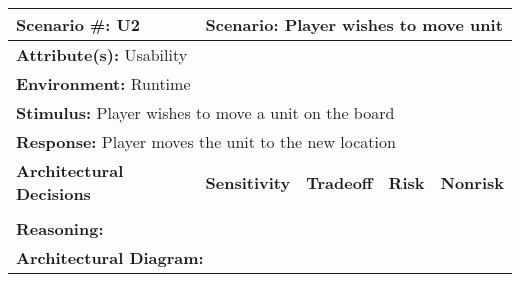 \begin{tabular}{|m{}|m{}|m{}|m{}|m{}|m{}|}
  \hline
  {\bf Scenario \#:} U2 & \multicolumn{5}{m{0.75 \textwidth}|}{{\bf Scenario:} Player wishes to move unit} \\ \hline
  \multicolumn{6}{|m{0.9 \textwidth}|}{{\bf Attribute(s):} Usability} \\ \hline
  \multicolumn{6}{|m{0.9 \textwidth}|}{{\bf Environment:} Runtime} \\ \hline
  \multicolumn{6}{|m{0.9 \textwidth}|}{{\bf Stimulus:} Player wishes to move a unit on the board} \\ \hline
  \multicolumn{6}{|m{0.9 \textwidth}|}{{\bf Response:} Player moves the unit to the new location} \\ \hline
  \multicolumn{2}{|m{0.3 \textwidth}|}{\bf Architectural Decisions} & {\bf Sensitivity} & {\bf Tradeoff} & {\bf Risk} & {\bf Nonrisk} \\ \hline
  \multicolumn{2}{|m{0.3 \textwidth}|}{} &  &  &  &  \\ \hline
  \multicolumn{6}{|m{0.9 \textwidth}|}{{\bf Reasoning:} } \\ \hline
  \multicolumn{6}{|m{0.9 \textwidth}|}{{\bf Architectural Diagram:} } \\ \hline
\end{tabular}
